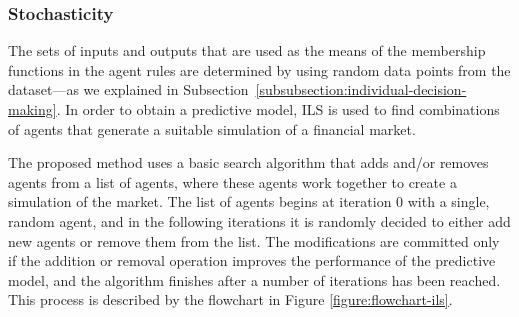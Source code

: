 \documentclass{ieeeaccess}
\begin{document}


\subsubsection{Stochasticity}
\label{subsubsection:stochasticity}



The sets of inputs and outputs that are used as the means of the membership functions in the agent rules are determined by using random data points from the dataset---as we explained in Subsection~\ref{subsubsection:individual-decision-making}. In order to obtain a predictive model, ILS is used to find combinations of agents that generate a suitable simulation of a financial market.

The proposed method uses a basic search algorithm that adds and/or removes agents from a list of agents, where these agents work together to create a simulation of the market. The list of agents begins at iteration 0 with a single, random agent, and in the following iterations it is randomly decided to either add new agents or remove them from the list. The modifications are committed only if the addition or removal operation improves the performance of the predictive model, and the algorithm finishes after a number of iterations has been reached. This process is described by the flowchart in Figure \ref{figure:flowchart-ils}.
\end{document}
